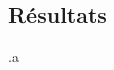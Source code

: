 \documentclass[a4paper, 12pt, twoside]{article}
\begin{document}
    \vspace{12pt}
    
    \begin{indt}{\section{Résultats}} %
        .a
    \end{indt} %
    
\end{document}
